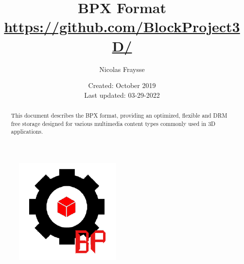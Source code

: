 \documentclass{article}
\title{
    \huge \textbf{BPX Format} \\
    \large \url{https://github.com/BlockProject3D/}
}
\author{Nicolas Fraysse}
\date{
	Created: October 2019 \\
	Last updated: 03-29-2022
}
\begin{document}
\maketitle

\begin{figure}[h!]
    \centering
    \includegraphics[scale=1.1]{logo}
    \label{fig:logo}
\end{figure}

\newpage

\begin{abstract}
    This document describes the BPX format, providing an optimized, flexible and DRM \cite{DRM} free storage designed for various multimedia content types commonly used in 3D applications.
\end{abstract}
\doclicenseThis
















\end{document}
